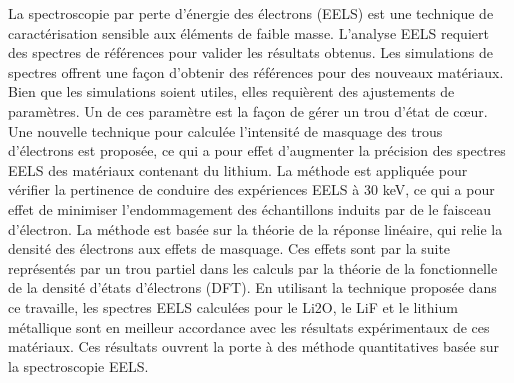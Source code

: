 

La spectroscopie par perte d'\'energie des \'electrons (EELS) est une technique de caract\'erisation sensible aux \'el\'ements de faible masse.  L'analyse EELS requiert des spectres de r\'ef\'erences pour valider les r\'esultats obtenus. Les simulations de spectres offrent une façon d'obtenir des r\'ef\'erences pour des nouveaux mat\'eriaux.  Bien que les simulations soient utiles, elles requi\`erent des ajustements de param\`etres.  Un de ces param\`etre est la fa\c{c}on de g\'erer un trou d'\'etat de c\oe ur. Une nouvelle technique pour calcul\'ee l'intensit\'e de masquage des trous d'\'electrons est propos\'ee, ce qui a pour effet d'augmenter la pr\'ecision des spectres EELS des mat\'eriaux contenant du lithium. La m\'ethode est appliquée pour v\'erifier la pertinence de conduire des expériences EELS \`a 30 keV, ce qui a pour effet de minimiser l'endommagement des \'echantillons induits par de le faisceau d'électron. La m\'ethode est bas\'ee sur la th\'eorie de la r\'eponse lin\'eaire, qui relie la densit\'e des \'electrons aux effets de masquage. Ces effets sont par la suite repr\'esentés par un trou partiel dans les calculs par la th\'eorie de la fonctionnelle de la densité d'états d'électrons (DFT). En utilisant la technique propos\'ee dans ce travaille, les spectres EELS calcul\'ees pour le Li2O, le LiF et le lithium métallique sont en meilleur accordance avec les r\'esultats exp\'erimentaux de ces mat\'eriaux. Ces r\'esultats ouvrent la porte \`a des méthode quantitatives bas\'ee sur la spectroscopie EELS.


